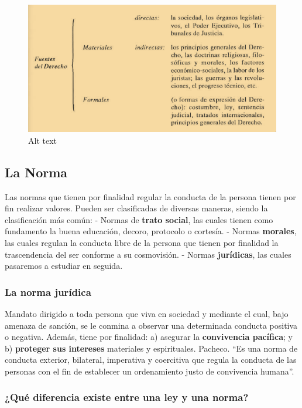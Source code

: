 \documentclass[]{article}
\begin{document}
\begin{figure}
\centering
\includegraphics{fuentes.png?raw=true}
\caption{Alt text}
\end{figure}

\hypertarget{la-norma}{%
\subsection{La Norma}\label{la-norma}}

Las normas que tienen por finalidad regular la conducta de la persona
tienen por fin realizar valores. Pueden ser clasificadas de diversas
maneras, siendo la clasificación más común: - Normas de \textbf{trato
social}, las cuales tienen como fundamento la buena educación, decoro,
protocolo o cortesía. - Normas \textbf{morales}, las cuales regulan la
conducta libre de la persona que tienen por finalidad la trascendencia
del ser conforme a su cosmovisión. - Normas \textbf{jurídicas}, las
cuales pasaremos a estudiar en seguida.

\hypertarget{la-norma-juruxeddica}{%
\subsubsection{La norma jurídica}\label{la-norma-juruxeddica}}

Mandato dirigido a toda persona que viva en sociedad y mediante el cual,
bajo amenaza de sanción, se le conmina a observar una determinada
conducta positiva o negativa. Además, tiene por finalidad: a) asegurar
la \textbf{convivencia pacífica}; y b) \textbf{proteger sus intereses}
materiales y espirituales. Pacheco. ``Es una norma de conducta exterior,
bilateral, imperativa y coercitiva que regula la conducta de las
personas con el fin de establecer un ordenamiento justo de convivencia
humana''.

\hypertarget{quuxe9-diferencia-existe-entre-una-ley-y-una-norma}{%
\subsubsection{¿Qué diferencia existe entre una ley y una
norma?}\label{quuxe9-diferencia-existe-entre-una-ley-y-una-norma}}
\end{document}
